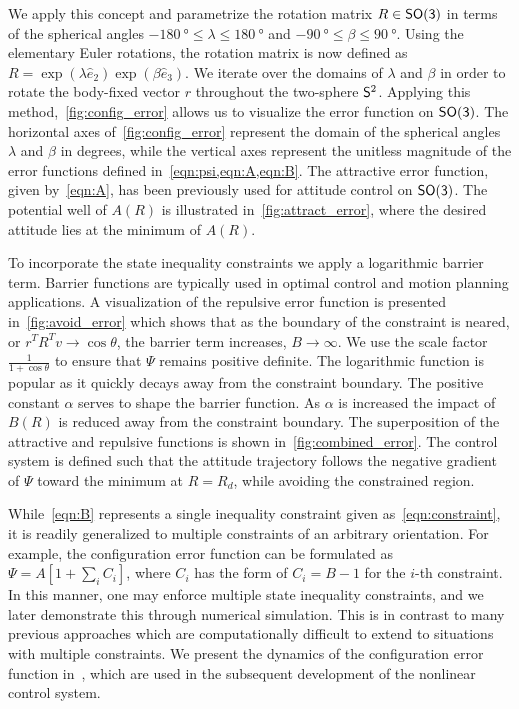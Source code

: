 \documentclass[10pt,fleqn]{IJCAS}  %
\begin{document}
\begin{multicols}{2}
We apply this concept and parametrize the rotation matrix \( R \in \SO \) in terms of the spherical angles \( \SI{-180}{\degree} \leq \lambda \leq \SI{180}{\degree}  \) and \( \SI{-90}{\degree} \leq \beta \leq \SI{90}{\degree} \). 
Using the elementary Euler rotations, the rotation matrix is now defined as \( R = \exp( \lambda \hat{e}_2) \exp( \beta \hat{e}_3) \).
We iterate over the domains of \( \lambda\) and \(\beta\) in order to rotate the body-fixed vector \( r \) throughout the two-sphere \( \S^2 \).
Applying this method,~\cref{fig:config_error} allows us to visualize the error function on \( \SO \).
The horizontal axes of~\cref{fig:config_error} represent the domain of the spherical angles \( \lambda \) and \( \beta \) in degrees, while the vertical axes represent the unitless magnitude of the error functions defined in~\cref{eqn:psi,eqn:A,eqn:B}.
The attractive error function, given by~\cref{eqn:A}, has been previously used for attitude control on \(\SO\).
The potential well of \( A(R)\) is illustrated in~\cref{fig:attract_error}, where the desired attitude lies at the minimum of \( A(R) \).

To incorporate the state inequality constraints we apply a logarithmic barrier term.
Barrier functions are typically used in optimal control and motion planning applications.
A visualization of the repulsive error function is presented in~\cref{fig:avoid_error} which shows that as the boundary of the constraint is neared, or \( r^T R^T v \to \cos \theta \), the barrier term increases, \( B \to \infty\).
We use the scale factor~\(\frac{1}{1+\cos \theta} \) to ensure that \( \Psi \) remains positive definite.
The logarithmic function is popular as it quickly decays away from the constraint boundary.
The positive constant \( \alpha \) serves to shape the barrier function.
As \( \alpha \) is increased the impact of \( B(R) \) is reduced away from the constraint boundary. 
The superposition of the attractive and repulsive functions is shown in~\cref{fig:combined_error}.
The control system is defined such that the attitude trajectory follows the negative gradient of \( \Psi \) toward the minimum at \( R = R_d \), while avoiding the constrained region.

While~\cref{eqn:B} represents a single inequality constraint given as~\cref{eqn:constraint}, it is readily generalized to multiple constraints of an arbitrary orientation. 
For example, the configuration error function can be formulated as $\Psi=A[1+\sum_i C_i]$, where $C_i$ has the form of $C_i=B-1$ for the $i$-th constraint. 
In this manner, one may enforce multiple state inequality constraints, and we later demonstrate this through numerical simulation. 
This is in contrast to many previous approaches which are computationally difficult to extend to situations with multiple constraints.
We present the dynamics of the configuration error function in~, which are used in the subsequent development of the nonlinear control system.


\end{multicols}
\end{document}
